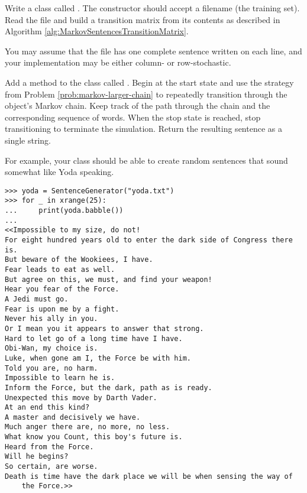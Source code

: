 \begin{problem} %
Write a class called .
The constructor should accept a filename (the training set).
Read the file and build a transition matrix from its contents as described in Algorithm \ref{alg:MarkovSentencesTransitionMatrix}.

You may assume that the file has one complete sentence written on each line, and your implementation may be either column- or row-stochastic.
\label{problem:markov-random-sentences-init}
\end{problem}

\begin{problem} %
Add a method to the  class called .
Begin at the start state and use the strategy from Problem \ref{prob:markov-larger-chain} to repeatedly transition through the object's Markov chain.
Keep track of the path through the chain and the corresponding sequence of words.
When the stop state is reached, stop transitioning to terminate the simulation.
Return the resulting sentence as a single string.

For example, your  class should be able to create random sentences that sound somewhat like Yoda speaking.

\begin{lstlisting}
>>> yoda = SentenceGenerator("yoda.txt")
>>> for _ in xrange(25):
... 	print(yoda.babble())
...
<<Impossible to my size, do not!
For eight hundred years old to enter the dark side of Congress there is.
But beware of the Wookiees, I have.
Fear leads to eat as well.
But agree on this, we must, and find your weapon!
Hear you fear of the Force.
A Jedi must go.
Fear is upon me by a fight.
Never his ally in you.
Or I mean you it appears to answer that strong.
Hard to let go of a long time have I have.
Obi-Wan, my choice is.
Luke, when gone am I, the Force be with him.
Told you are, no harm.
Impossible to learn he is.
Inform the Force, but the dark, path as is ready.
Unexpected this move by Darth Vader.
At an end this kind?
A master and decisively we have.
Much anger there are, no more, no less.
What know you Count, this boy's future is.
Heard from the Force.
Will he begins?
So certain, are worse.
Death is time have the dark place we will be when sensing the way of
    the Force.>>
\end{lstlisting}

\label{prob:markov-random-sentences-babble}
\end{problem}

